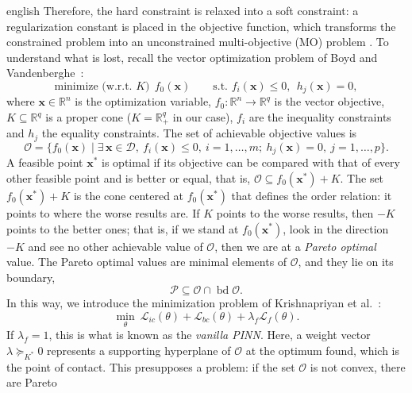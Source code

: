 \documentclass[11pt,letterpaper,twoside,openright]{book} %
\newcommand{\Loss}{\mathcal{L}}
\begin{document}
\begin{hyphenrules}{english}
Therefore, the hard constraint is relaxed into a soft constraint: a regularization constant is placed in
the objective function, which transforms the constrained problem into an unconstrained multi-objective
(MO) problem \cite{krishnapriyan2021}. To understand what is lost, recall the vector optimization
problem of Boyd and Vandenberghe~\cite{boyd2004}:
\begin{equation}
  \text{minimize (w.r.t. } K)\ \ f_0(\mathbf{x})\qquad\text{s.t. } f_i(\mathbf{x})\le0,\ \ h_j(\mathbf{x})=0,
  \label{eq:vector-opt}
\end{equation}
where $\mathbf{x}\in\mathbb{R}^n$ is the optimization variable, $f_0:\mathbb{R}^n\to\mathbb{R}^q$ is the vector objective,
$K\subseteq\mathbb{R}^q$ is a proper cone ($K=\mathbb{R}^q_+$ in our case), $f_i$ are the inequality constraints and
$h_j$ the equality constraints. The set of achievable objective values is
\begin{equation}
  \mathcal{O}=\{f_0(\mathbf{x})\mid\exists\,\mathbf{x}\in\mathcal{D},\ f_i(\mathbf{x})\le0,\ i=1,\dots,m;\ h_j(\mathbf{x})=0,\ j=1,\dots,p\}.
  \label{eq:achievable-set}
\end{equation}
A feasible point $\mathbf{x}^{*}$ is optimal if its objective can be compared with that of every other feasible
point and is better or equal, that is, $\mathcal{O}\subseteq f_0(\mathbf{x}^{*})+K$. The set $f_0(\mathbf{x}^{*})+K$ is
the cone centered at $f_0(\mathbf{x}^{*})$ that defines the order relation: it points to where the worse results
are. If $K$ points to the worse results, then $-K$ points to the better ones; that is, if we stand at
$f_0(\mathbf{x}^{*})$, look in the direction $-K$ and see no other achievable value of $\mathcal{O}$, then we are at
a \emph{Pareto optimal} value. The Pareto optimal values are minimal elements of $\mathcal{O}$, and they
lie on its boundary,
\begin{equation}
  \mathcal{P}\subseteq\mathcal{O}\cap\operatorname{bd}\mathcal{O}.
  \label{eq:pareto}
\end{equation}
In this way, we introduce the minimization problem of Krishnapriyan et al.~\cite{krishnapriyan2021}:
\begin{equation}
  \min_{\theta}\ \Loss_{ic}(\theta)+\Loss_{bc}(\theta)+\lambda_f\Loss_f(\theta).
  \label{eq:soft}
\end{equation}
If $\lambda_f=1$, this is what is known as the \emph{vanilla PINN}. Here, a weight vector
$\lambda\succeq_{K^{*}}0$ represents a supporting hyperplane of $\mathcal{O}$ at the optimum found, which is
the point of contact. This presupposes a problem: if the set $\mathcal{O}$ is not convex, there are Pareto

\end{hyphenrules}
\end{document}
